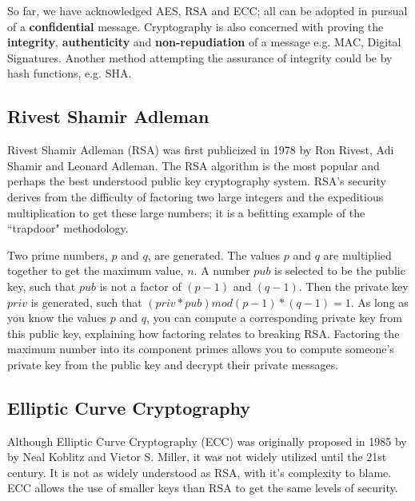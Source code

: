 So far, we have acknowledged AES, RSA and ECC; all can be adopted in pursual of a \textbf{confidential} message. Cryptography is also concerned with proving the \textbf{integrity}, \textbf{authenticity} and \textbf{non-repudiation} of a message e.g. MAC, Digital Signatures. Another method attempting the assurance of integrity could be by hash functions, e.g. SHA.

\subsection{Rivest Shamir Adleman}
 Rivest Shamir Adleman (RSA) was first publicized in 1978 by Ron Rivest, Adi Shamir and Leonard Adleman. The RSA algorithm is the most popular and  perhaps the best understood public key cryptography system. RSA's security derives from the difficulty of factoring two large integers and the expeditious multiplication to get these large numbers; it is a befitting example of the ``trapdoor" methodology. 
 
 Two prime numbers, \(p\) and \(q\), are generated. The values \(p\) and \(q\) are multiplied together to get the maximum value, \(n\). A number \(pub\) is selected to be the public key, such that \(pub\) is not a factor of \((p - 1)\) and \((q - 1)\). Then the private key \(priv\) is generated, such that \((priv * pub) mod (p - 1) * (q - 1) = 1\). 
 As long as you know the values \(p\) and \(q\), you can compute a corresponding private key from this public key, explaining how factoring relates to breaking RSA. Factoring the maximum number into its component primes allows you to compute someone's private key from the public key and decrypt their private messages.

\subsection{Elliptic Curve Cryptography}

Although Elliptic Curve Cryptography (ECC) was originally proposed in 1985 by by Neal Koblitz and Victor S. Miller, it was not widely utilized until the 21st century. It is not as widely understood as RSA, with it's complexity to blame. ECC allows the use of smaller keys than RSA to get the same levels of security. 

